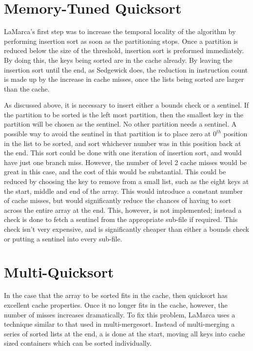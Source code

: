 \section{Memory-Tuned Quicksort}

LaMarca's first step was to increase the temporal locality of the algorithm by
performing insertion sort as soon as the partitioning stops. Once a partition is
reduced below the size of the threshold, insertion sort is preformed
immediately. By doing this, the keys being sorted are in the cache already. By
leaving the insertion sort until the end, as Sedgewick does, the reduction in
instruction count is made up by the increase in cache misses, once the
lists being sorted are larger than the cache. 

As discussed above, it is necessary to insert either a bounds check or a
sentinel.  If the partition to be sorted is the left most partition, then the
smallest key in the partition will be chosen as the sentinel. No other
partition needs a sentinel. A possible way to avoid the sentinel in that
partition is to place zero at $0^{th}$ position in the list to be sorted, and
sort whichever number was in this position back at the end. This sort could be
done with one iteration of insertion sort, and would have just one branch miss.
However, the number of level 2 cache misses would be great in this case,
and the cost of this would be substantial. This could be reduced by
choosing the key to remove from a small list, such as the eight keys at the
start, middle and end of the array. This would introduce a constant number of
cache misses, but would significantly reduce the chances of having to sort
across the entire array at the end. This, however, is not implemented; instead a
check is done to fetch a sentinel from the appropriate sub-file if required. This
check isn't very expensive, and is significantly cheaper than either a bounds
check or putting a sentinel into every sub-file.

\section{Multi-Quicksort}

In the case that the array to be sorted fits in the cache, then quicksort has
excellent cache properties. Once it no longer fits in the cache, however, the
number of misses increases dramatically. To fix this problem, LaMarca uses a
technique similar to that used in multi-mergesort. Instead of multi-merging a
series of sorted lists at the end, a  is done at the start,
moving all keys into cache sized containers which can be sorted individually.

